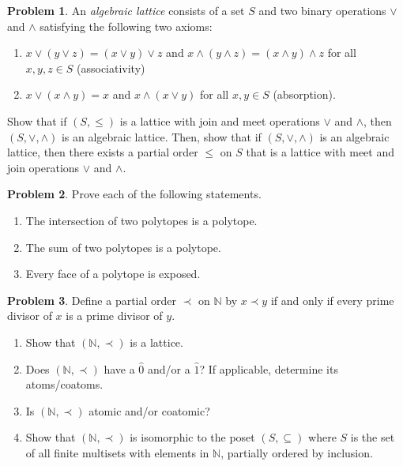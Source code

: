 \documentclass[letterpaper,11pt]{amsart}
\theoremstyle{plain}
\theoremstyle{definition}
\newtheorem{pr}{Problem}
\theoremstyle{remark}
\begin{document}
\begin{pr}\label{pr: algebraic definition of lattice}
    An \emph{algebraic lattice} consists of a set $S$ and two binary operations $\vee$ and $\wedge$ satisfying the following two axioms:
    \begin{enumerate}
        \item $x \vee (y \vee z) = (x \vee y) \vee z$ and $x \wedge (y \wedge z) = (x \wedge y) \wedge z$ for all $x,y,z \in S$ (associativity)
        \item $x \vee (x \wedge y) = x$ and $x \wedge (x \vee y)$ for all $x, y \in S$ (absorption).
    \end{enumerate}
    Show that if $(S,\le)$ is a lattice with join and meet operations $\vee$ and $\wedge$, then $(S,\vee,\wedge)$ is an algebraic lattice.
    Then, show that if $(S,\vee,\wedge)$ is an algebraic lattice,
    then there exists a partial order $\le$ on $S$ that is a lattice with meet and join operations $\vee$ and $\wedge$.
\end{pr}

\bigskip


\bigskip

\begin{pr}
    Prove each of the following statements. 
    \begin{enumerate}
        \item The intersection of two polytopes is a polytope.
        \item The sum of two polytopes is a polytope.
        \item Every face of a polytope is exposed.
    \end{enumerate}
\end{pr}


\begin{pr}\label{pr: divisor lattice}
    Define a partial order $\prec$ on $\mathbb{N}$ by $x \prec y$ if and only if every prime divisor of $x$ is a prime divisor of $y$.
    \begin{enumerate}
        \item Show that $(\mathbb{N},\prec)$ is a lattice.
        \item Does $(\mathbb{N},\prec)$ have a $\hat{0}$ and/or a $\hat{1}$? If applicable, determine its atoms/coatoms.
        \item Is $(\mathbb{N},\prec)$ atomic and/or coatomic?
        \item Show that $(\mathbb{N},\prec)$ is isomorphic to the poset $(S,\subseteq)$ where $S$ is the set of all finite multisets with elements in $\mathbb{N}$, partially ordered by inclusion.
    \end{enumerate}
\end{pr}
\end{document}
